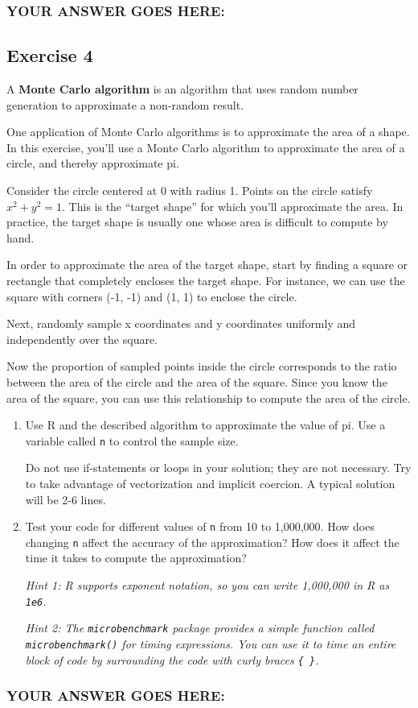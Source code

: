 \documentclass[
]{article}
\begin{document}
\hypertarget{your-answer-goes-here-2}{%
\subsubsection{YOUR ANSWER GOES HERE:}\label{your-answer-goes-here-2}}

\hypertarget{exercise-4}{%
\subsection{Exercise 4}\label{exercise-4}}

A \textbf{Monte Carlo algorithm} is an algorithm that uses random number
generation to approximate a non-random result.

One application of Monte Carlo algorithms is to approximate the area of
a shape. In this exercise, you'll use a Monte Carlo algorithm to
approximate the area of a circle, and thereby approximate pi.

Consider the circle centered at 0 with radius 1. Points on the circle
satisfy \(x^2 + y^2 = 1\). This is the ``target shape'' for which you'll
approximate the area. In practice, the target shape is usually one whose
area is difficult to compute by hand.

In order to approximate the area of the target shape, start by finding a
square or rectangle that completely encloses the target shape. For
instance, we can use the square with corners (-1, -1) and (1, 1) to
enclose the circle.

Next, randomly sample x coordinates and y coordinates uniformly and
independently over the square.

Now the proportion of sampled points inside the circle corresponds to
the ratio between the area of the circle and the area of the square.
Since you know the area of the square, you can use this relationship to
compute the area of the circle.

\begin{enumerate}
\def\labelenumi{\arabic{enumi}.}
\item
  Use R and the described algorithm to approximate the value of pi. Use
  a variable called \texttt{n} to control the sample size.

  Do not use if-statements or loops in your solution; they are not
  necessary. Try to take advantage of vectorization and implicit
  coercion. A typical solution will be 2-6 lines.
\item
  Test your code for different values of \texttt{n} from 10 to
  1,000,000. How does changing \texttt{n} affect the accuracy of the
  approximation? How does it affect the time it takes to compute the
  approximation?

  \emph{Hint 1: R supports exponent notation, so you can write 1,000,000
  in R as \texttt{1e6}.}

  \emph{Hint 2: The \texttt{microbenchmark} package provides a simple
  function called \texttt{microbenchmark()} for timing expressions. You
  can use it to time an entire block of code by surrounding the code
  with curly braces \texttt{\{\ \}}.}
\end{enumerate}

\hypertarget{your-answer-goes-here-3}{%
\subsubsection{YOUR ANSWER GOES HERE:}\label{your-answer-goes-here-3}}
\end{document}
